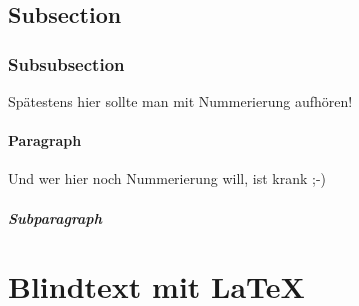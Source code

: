 \subsection{Subsection}
\subsubsection{Subsubsection}
Spätestens hier sollte man mit Nummerierung aufhören!
\paragraph{Paragraph}
Und wer hier noch Nummerierung will, ist krank ;-)
\subparagraph{Subparagraph}




\section{Blindtext mit \LaTeX}
\lipsum








